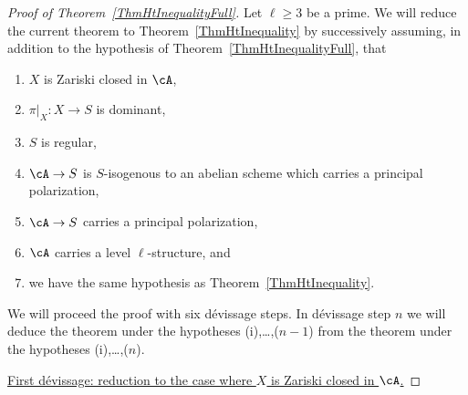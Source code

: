 \begin{proof}[Proof of Theorem~\ref{ThmHtInequalityFull}]
  Let $\ell\ge 3$ be a prime.
  We will  reduce the current theorem to Theorem~\ref{ThmHtInequality}
  by successively assuming, in addition to the hypothesis of Theorem~\ref{ThmHtInequalityFull}, that
\begin{enumerate}
  \item[(i)] $X$ is Zariski closed in $\cA$,
  \item[(ii)] $\pi|_X \colon X\rightarrow S$ is dominant,
  \item[(iii)] $S$ is regular,
  \item[(iv)] $\cA \rightarrow S$ is $S$-isogenous to an abelian scheme which carries a principal polarization,
  \item[(v)] $\cA \rightarrow S$ carries a principal polarization,
  \item[(vi)] $\cA$ carries a level $\ell$-structure, and
  \item[(vii)]  we have the same hypothesis as Theorem~\ref{ThmHtInequality}.%
%
\end{enumerate}
We will proceed the proof with six d\'{e}vissage steps.
In d\'evissage step $n$ we will deduce
the theorem under the hypotheses (i),\ldots,($n-1$)
from the theorem under the hypotheses (i),\ldots,($n$).


\ul{First d\'{e}vissage: reduction to the case where $X$ is Zariski
  closed in $\cA$.}


\end{proof}

